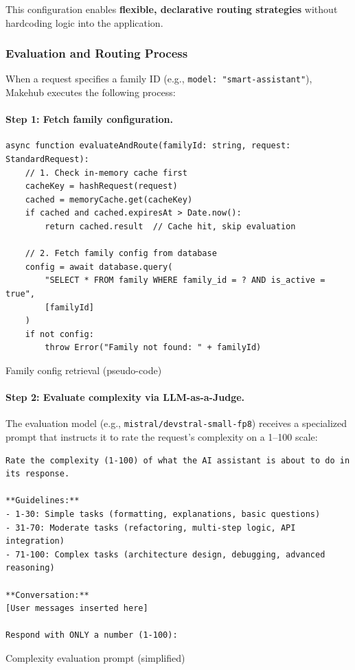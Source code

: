 \documentclass[english]{article}
\begin{document}
This configuration enables \textbf{flexible, declarative routing strategies} without hardcoding logic into the application.

\subsubsection{Evaluation and Routing Process}

When a request specifies a family ID (e.g., \texttt{model: "smart-assistant"}), Makehub executes the following process:

\paragraph{Step 1: Fetch family configuration.}

\begin{listing}[H]
\begin{verbatim}
async function evaluateAndRoute(familyId: string, request: StandardRequest):
    // 1. Check in-memory cache first
    cacheKey = hashRequest(request)
    cached = memoryCache.get(cacheKey)
    if cached and cached.expiresAt > Date.now():
        return cached.result  // Cache hit, skip evaluation

    // 2. Fetch family config from database
    config = await database.query(
        "SELECT * FROM family WHERE family_id = ? AND is_active = true",
        [familyId]
    )
    if not config:
        throw Error("Family not found: " + familyId)
\end{verbatim}
\caption{Family config retrieval (pseudo-code)}
\end{listing}

\paragraph{Step 2: Evaluate complexity via LLM-as-a-Judge.}

The evaluation model (e.g., \texttt{mistral/devstral-small-fp8}) receives a specialized prompt that instructs it to rate the request's complexity on a 1--100 scale:

\begin{listing}[H]
\begin{verbatim}
Rate the complexity (1-100) of what the AI assistant is about to do in its response.

**Guidelines:**
- 1-30: Simple tasks (formatting, explanations, basic questions)
- 31-70: Moderate tasks (refactoring, multi-step logic, API integration)
- 71-100: Complex tasks (architecture design, debugging, advanced reasoning)

**Conversation:**
[User messages inserted here]

Respond with ONLY a number (1-100):
\end{verbatim}
\caption{Complexity evaluation prompt (simplified)}
\end{listing}
\end{document}

